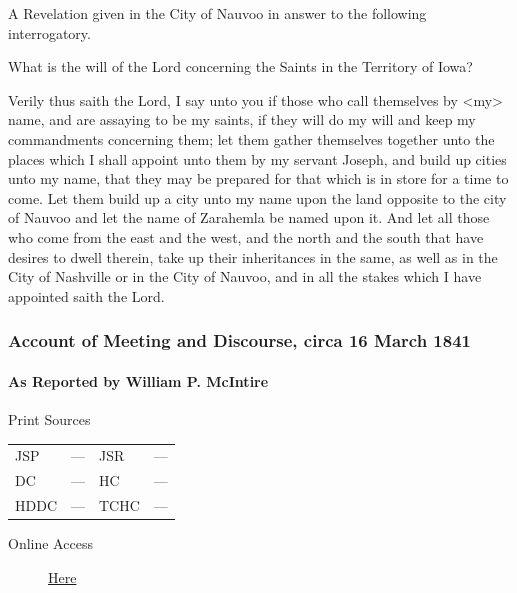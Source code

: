 				A Revelation given in the City of Nauvoo in answer to the following interrogatory.
				
				What is the will of the Lord concerning the Saints in the Territory of Iowa?
				
				Verily thus saith the Lord, I say unto you if those who call themselves by <my> name, and are assaying to be my saints, if they will do my will and keep my commandments concerning them; let them gather themselves together unto the places which I shall appoint unto them by my servant Joseph, and build up cities unto my name, that they may be prepared for that which is in store for a time to come. Let them build up a city unto my name upon the land opposite to the city of Nauvoo and let the name of Zarahemla be named upon it. And let all those who come from the east and the west, and the north and the south that have desires to dwell therein, take up their inheritances in the same, as well as in the City of Nashville or in the City of Nauvoo, and in all the stakes which I have appointed saith the Lord.
				
		\subsubsection{Account of Meeting and Discourse, circa 16 March 1841}
			\label{EMS-1841-JS-CIR-16-MAR-1841}
			
			\paragraph{As Reported by William P. McIntire}
				\label{EMS-1841-JS-CIR-16-MAR-1841-WM}
			
				\begin{description}
					\item[Print Sources]
				\end{description}

				\begin{tabular}{p{0.5in}p{1in}p{0.5in}p{1in}}
					JSP	 	& ---		& JSR 		& --- \\
					DC	 	& ---		& HC 		& --- \\
					HDDC 	& ---		& TCHC 		& --- \\
				\end{tabular}
				
				\begin{description}
					\item[Online Access] \href{https://www.josephsmithpapers.org/paper-summary/account-of-meeting-and-discourse-circa-16march-1841/1}{Here}
				\end{description}
				
